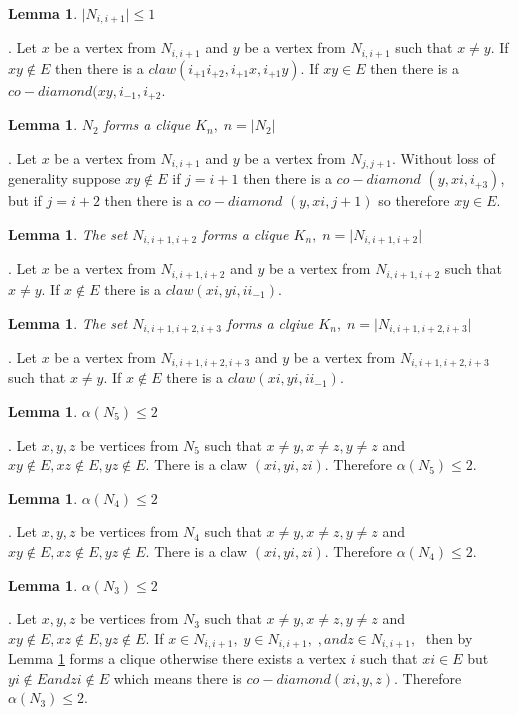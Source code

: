 \documentclass[12pt]{article}
\newtheorem{Lemma}[Theorem]{Lemma}
\def\VTWO{$N_{i , i+1}$}
\def\VJTWO{$N_{j , j+1}$}
\def\VTHREE{$N_{i , i+1, i+2}$}
\def\VFOUR{$N_{i , i+1, i+2, i+3}$}
\begin{document}
\begin{Lemma}\label{lem:2-vertex-one}
$|${\VTWO}$| \leq 1$
\end{Lemma}
. Let $x$ be a vertex from {\VTWO} and $y$ be a vertex from {\VTWO} such that $x \neq y$. If $xy \not \in E$ then there is a $claw (i_{+1}i_{+2},i_{+1}x, i_{+1}y)$. If $xy \in E$ then there is a $co-diamond (xy, i_{-1}, i_{+2}$. 

\begin{Lemma}\label{lem:2-vertex-clique}
$N_2$ forms a clique $K_n,\; n=|N_2|$
\end{Lemma}
. Let $x$ be a vertex from {\VTWO} and $y$  be a vertex from {\VJTWO}. Without loss of generality suppose $xy \not \in E$  if $j = i + 1$ then there is a $co-diamond$ $(y, xi, i_{+3})$, but if $j = i + 2$ then there is a $co-diamond$ $(y, xi, j+1)$ so therefore $xy \in E$.

\begin{Lemma}\label{lem:3-vertex-one}
The set {\VTHREE} forms a clique  $K_n,\; n = |${\VTHREE}$|$
\end{Lemma}
. Let $x$ be a vertex from {\VTHREE} and $y$ be a vertex from {\VTHREE} such that $x \neq y$. If $x \not \in E$ there is a $claw (xi, yi, ii_{-1})$.

\begin{Lemma}\label{lem:4-vertex-one}
The set {\VFOUR} forms a clqiue $K_n,\; n = |${\VFOUR}$|$
\end{Lemma}
. Let $x$ be a vertex from {\VFOUR} and $y$ be a vertex from {\VFOUR} such that $x \neq y$. If $x \not \in E$ there is a $claw (xi, yi, ii_{-1})$.

\begin{Lemma}\label{lem:5-vertex-max-isolated}
$\alpha(N_5) \leq 2$
\end{Lemma}
. Let $x, y, z$ be vertices from $N_5$ such that $x \neq y, x \neq z, y \neq z$ and $xy \not \in E, xz \not \in E, yz \not \in E$. There is a claw $(xi, yi, zi)$. Therefore $\alpha(N_5) \leq 2$.

\begin{Lemma}\label{lem:4-vertex-max-isolated}
$\alpha(N_4) \leq 2$
\end{Lemma}
. Let $x, y, z$ be vertices from $N_4$ such that $x \neq y, x \neq z, y \neq z$ and $xy \not \in E, xz \not \in E, yz \not \in E$. There is a claw $(xi, yi, zi)$. Therefore $\alpha(N_4) \leq 2$.

\begin{Lemma}\label{lem:3-vertex-max-isolated}
$\alpha(N_3) \leq 2$
\end{Lemma}
. Let $x, y, z$ be vertices from $N_3$ such that $x \neq y, x \neq z, y \neq z$ and $xy \not \in E, xz \not \in E, yz \not \in E$. If $x \in ${\VTWO}$,\; y \in ${\VTWO}$,\;, and z \in ${\VTWO}$,\;$ then by Lemma \ref{lem:3-vertex-one} forms a clique otherwise there exists a vertex $i$ such that $xi \in E$ but $yi \not \in E and zi \not \in E$ which means there is $co-diamond (xi, y ,z)$. Therefore $\alpha(N_3) \leq 2$.
\end{document}
